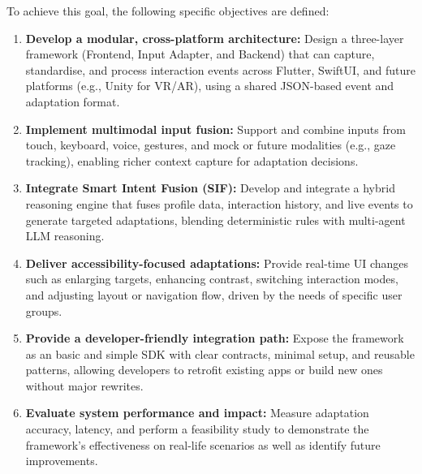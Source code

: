 \documentclass[openany]{book}
\begin{document}
To achieve this goal, the following specific objectives are defined:
\begin{enumerate}
    \item \textbf{Develop a modular, cross-platform architecture:} Design a three-layer framework (Frontend, Input Adapter, and Backend) that can capture, standardise, and process interaction events across Flutter, SwiftUI, and future platforms (e.g., Unity for VR/AR), using a shared JSON-based event and adaptation format.
    \item \textbf{Implement multimodal input fusion:} Support and combine inputs from touch, keyboard, voice, gestures, and mock or future modalities (e.g., gaze tracking), enabling richer context capture for adaptation decisions.
    \item \textbf{Integrate Smart Intent Fusion (SIF):} Develop and integrate a hybrid reasoning engine that fuses profile data, interaction history, and live events to generate targeted adaptations, blending deterministic rules with multi-agent LLM reasoning.
    \item \textbf{Deliver accessibility-focused adaptations:} Provide real-time UI changes such as enlarging targets, enhancing contrast, switching interaction modes, and adjusting layout or navigation flow, driven by the needs of specific user groups.
    \item \textbf{Provide a developer-friendly integration path:} Expose the framework as an basic and simple SDK with clear contracts, minimal setup, and reusable patterns, allowing developers to retrofit existing apps or build new ones without major rewrites.
    \item \textbf{Evaluate system performance and impact:} Measure adaptation accuracy, latency, and perform a feasibility study to demonstrate the framework’s effectiveness on real-life scenarios as well as identify future improvements.
\end{enumerate}

\newpage 
\end{document}
